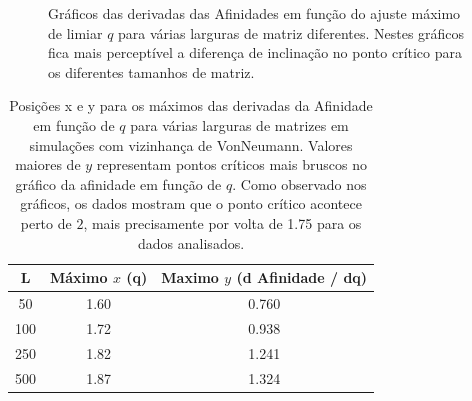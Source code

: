 \documentclass[
	12pt,				%
	openright,			%
	twoside,			%
	a4paper,			%
	english,			%
	french,				%
	spanish,			%
	brazil				%
	]{abntex2}
\begin{document}
\begin{figure}
  \centering

  \caption{Gráficos das derivadas das Afinidades em função do ajuste máximo de limiar $q$ para várias larguras de matriz diferentes. Nestes gráficos fica mais perceptível a diferença de inclinação no ponto crítico para os diferentes tamanhos de matriz.}
  \label{fig:DerivadasAfinidades}
\end{figure}

\begin{table}
  \centering
  \caption{Posições x e y para os máximos das derivadas da Afinidade em função de $q$ para várias larguras de matrizes em simulações com vizinhança de VonNeumann. Valores maiores de $y$ representam pontos críticos mais bruscos no gráfico da afinidade em função de $q$. Como observado nos gráficos, os dados mostram que o ponto crítico acontece perto de $2$, mais precisamente por volta de 1.75 para os dados analisados.}
  \label{tab:maximosAfinidadeVonNeumann}
  \begin{tabular}{ccc}\toprule
    L	& Máximo $x$ (q)	& Maximo $y$ (d Afinidade / dq)\\\midrule\midrule
    50	& 1.60 &	0.760\\
    100	& 1.72 &	0.938\\
    250	& 1.82 &	1.241\\
    500	& 1.87 &	1.324\\\bottomrule
  \end{tabular}
\end{table}
\end{document}
